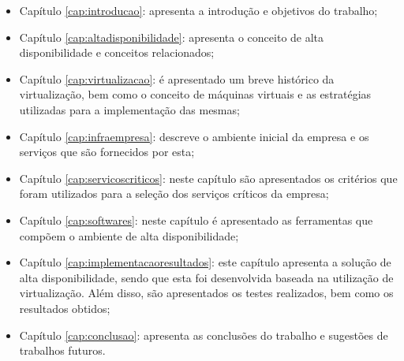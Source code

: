 \begin{itemize}
 \item Capítulo \ref{cap:introducao}: apresenta a introdução e objetivos do trabalho;
 \item Capítulo \ref{cap:altadisponibilidade}: apresenta o conceito de alta disponibilidade e conceitos relacionados;
 \item Capítulo \ref{cap:virtualizacao}: é apresentado um breve histórico da virtualização, bem como o conceito de máquinas virtuais e as 
 estratégias utilizadas para a implementação das mesmas;
 \item Capítulo \ref{cap:infraempresa}: descreve o ambiente inicial da empresa e os serviços que são fornecidos por esta;
 \item Capítulo \ref{cap:servicoscriticos}: neste capítulo são apresentados os critérios que foram utilizados para a seleção dos serviços 
 críticos da empresa;
 \item Capítulo \ref{cap:softwares}: neste capítulo é apresentado as ferramentas que compõem o ambiente de alta disponibilidade;
 \item Capítulo \ref{cap:implementacaoresultados}: este capítulo apresenta a solução de alta disponibilidade, sendo que esta foi desenvolvida 
 baseada na utilização de virtualização. Além disso, são apresentados os testes realizados, bem como os resultados obtidos;
 \item Capítulo \ref{cap:conclusao}: apresenta as conclusões do trabalho e sugestões de trabalhos futuros.
\end{itemize}
